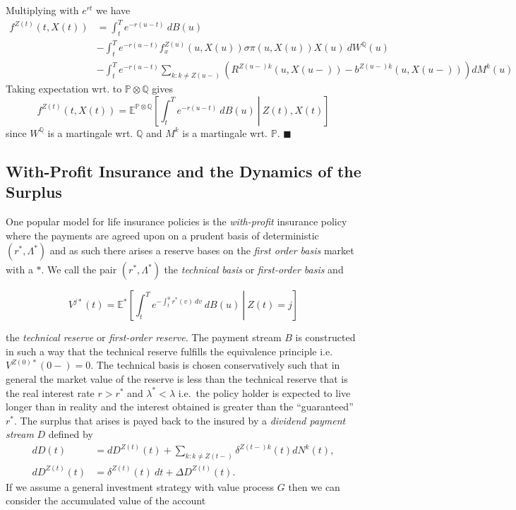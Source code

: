 \documentclass[
]{book}
\begin{document}
Multiplying with \(e^{rt}\) we have
\begin{align*}
f^{Z(t)}(t,X(t))&=\int_t^Te^{-r(u-t)}\ dB(u)\\
&-\int_t^Te^{-r(u-t)}f_x^{Z(u)}(u,X(u))\sigma \pi(u,X(u))X(u)\ dW^\mathbb Q(u)\\
&-\int_t^Te^{-r(u-t)}\sum_{k:k\ne Z(u-)}\left(R^{Z(u-)k}(u,X(u-))-b^{Z(u-)k}(u,X(u-))\right)dM^k(u)
\end{align*}
Taking expectation wrt. to \(\mathbb P\otimes \mathbb Q\) gives
\[
f^{Z(t)}(t,X(t))=\mathbb E^{\mathbb P \otimes \mathbb Q}\left[\left.\int_t^Te^{-r(u-t)}\ dB(u)\ \right\vert\ Z(t),X(t) \right]
\]
since \(W^\mathbb Q\) is a martingale wrt. \(\mathbb Q\) and \(M^k\) is a martingale wrt. \(\mathbb P\). \(\blacksquare\)

\hypertarget{with-profit-insurance-and-the-dynamics-of-the-surplus}{%
\subsection{With-Profit Insurance and the Dynamics of the Surplus}\label{with-profit-insurance-and-the-dynamics-of-the-surplus}}

One popular model for life insurance policies is the \emph{with-profit} insurance policy where the payments are agreed upon on a prudent basis of deterministic \((r^*,\Lambda ^*)\) and as such there arises a reserve bases on the \emph{first order basis} market with a \(*\). We call the pair \((r^*,\Lambda ^*)\) the \emph{technical basis} or \emph{first-order basis} and

\[
V^{j*}(t)=\mathbb E^*\left[\left.\int_t^Te^{-\int_t^u r^*(v)\ dv}\ dB(u)\ \right\vert\ Z(t)=j\right]
\]

the \emph{technical reserve} or \emph{first-order reserve}. The payment stream \(B\) is constructed in such a way that the technical reserve fulfills the equivalence principle i.e.~\(V^{Z(0)*}(0-)=0\). The technical basis is chosen conservatively such that in general the market value of the reserve is less than the technical reserve that is the real interest rate \(r>r^*\) and \(\lambda^*<\lambda\) i.e.~the policy holder is expected to live longer than in reality and the interest obtained is greater than the ``guaranteed'' \(r^*\). The surplus that arises is payed back to the insured by a \emph{dividend payment stream} \(D\) defined by
\begin{align*}
dD(t)&=dD^{Z(t)}(t)+\sum_{k:k\ne Z(t-)}\delta^{Z(t-)k}(t)dN^k(t),\\
dD^{Z(t)}(t)&=\delta^{Z(t)}(t)\ dt+\Delta D^{Z(t)}(t).
\end{align*}
If we assume a general investment strategy with value process \(G\) then we can consider the accumulated value of the account
\end{document}

